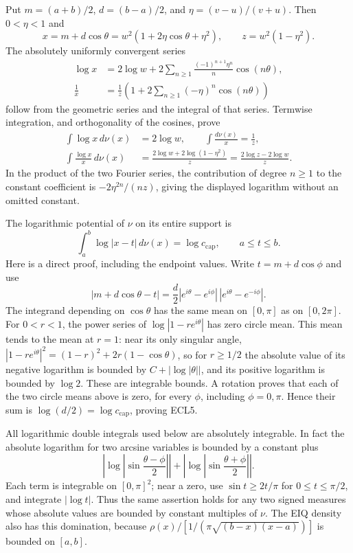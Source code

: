 \documentclass[11pt,a4paper]{article}
\begin{document}
Put $m=(a+b)/2$, $d=(b-a)/2$, and $\eta=(v-u)/(v+u)$.
Then $0<\eta<1$ and
\[
x=m+d\cos\theta
 =w^2(1+2\eta\cos\theta+\eta^2),\qquad
z=w^2(1-\eta^2).
\]
The absolutely uniformly convergent series
\[
\begin{split}
\log x&=2\log w+
  2\sum_{n\geq1}\frac{(-1)^{n+1}\eta^n}{n}\cos(n\theta),\\
\frac1x&=\frac1z\left(1+
  2\sum_{n\geq1}(-\eta)^n\cos(n\theta)\right)
\end{split}
\]
follow from the geometric series and the integral of that series.
Termwise integration, and orthogonality of the cosines, prove
\begin{equation}\tag{ECL4}
\begin{split}
\int\log x\,d\nu(x)&=2\log w,\qquad
\int\frac{d\nu(x)}x=\frac1z,\\
\int\frac{\log x}{x}\,d\nu(x)
 &=\frac{2\log w+2\log(1-\eta^2)}z
 =\frac{2\log z-2\log w}z.
\end{split}
\end{equation}
In the product of the two Fourier series, the contribution of degree
$n\geq1$ to the constant coefficient is
$-2\eta^{2n}/(nz)$, giving the displayed logarithm without an omitted
constant.

The logarithmic potential of $\nu$ on its entire support is
\begin{equation}\tag{ECL5}
\int_a^b\log|x-t|\,d\nu(x)=\log c_{\mathrm{cap}},
\qquad a\leq t\leq b.
\end{equation}
Here is a direct proof, including the endpoint values. Write
$t=m+d\cos\phi$ and use
\[
|m+d\cos\theta-t|
=\frac d2
 |e^{i\theta}-e^{i\phi}|\,
 |e^{i\theta}-e^{-i\phi}|.
\]
The integrand depending on $\cos\theta$ has the same mean on
$[0,\pi]$ as on $[0,2\pi]$. For $0<r<1$, the power series of
$\log|1-re^{i\theta}|$ has zero circle mean. This mean tends to
the mean at $r=1$: near its only singular angle,
$|1-re^{i\theta}|^2=(1-r)^2+2r(1-\cos\theta)$,
so for $r\geq1/2$ the absolute value of its negative logarithm
is bounded by $C+|\log|\theta||$, and its positive logarithm
is bounded by $\log2$. These are integrable bounds. A rotation
proves that each of the two circle means above is zero, for
every $\phi$, including $\phi=0,\pi$. Hence their sum is
$\log(d/2)=\log c_{\mathrm{cap}}$, proving ECL5.

All logarithmic double integrals used below are absolutely integrable.
In fact the absolute logarithm for two arcsine variables is bounded by
a constant plus
\[
\left|\log\left|\sin\frac{\theta-\phi}{2}\right|\right|
+\left|\log\left|\sin\frac{\theta+\phi}{2}\right|\right|.
\]
Each term is integrable on $[0,\pi]^2$; near a zero, use
$\sin t\geq 2t/\pi$ for $0\leq t\leq\pi/2$, and integrate
$|\log t|$. Thus the same assertion holds for any two signed
measures whose absolute values are bounded by constant multiples
of $\nu$. The EIQ density also has this domination, because
$\rho(x)/[1/(\pi\sqrt{(b-x)(x-a)})]$ is bounded on $[a,b]$.
\end{document}
